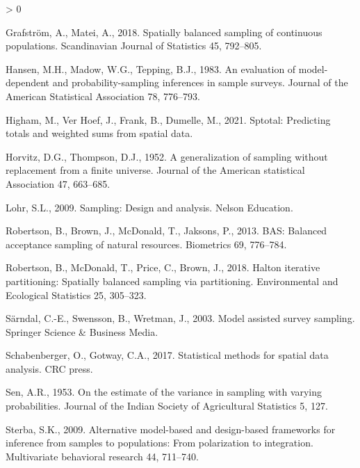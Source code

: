 \documentclass[]{elsarticle} %
\newlength{\cslhangindent}
\newenvironment{CSLReferences}[2] %
 {%
  \setlength{\parindent}{0pt}
  \ifodd #1 \everypar{\setlength{\hangindent}{\cslhangindent}}\ignorespaces\fi
  \ifnum #2 > 0
  \setlength{\parskip}{#2\baselineskip}
  \fi
 }%
 {}
\begin{document}
\begin{CSLReferences}{1}{0}
\leavevmode\hypertarget{ref-grafstrom2018spatially}{}%
Grafström, A., Matei, A., 2018. Spatially balanced sampling of
continuous populations. Scandinavian Journal of Statistics 45, 792--805.

\leavevmode\hypertarget{ref-hansen1983evaluation}{}%
Hansen, M.H., Madow, W.G., Tepping, B.J., 1983. An evaluation of
model-dependent and probability-sampling inferences in sample surveys.
Journal of the American Statistical Association 78, 776--793.

\leavevmode\hypertarget{ref-higham2021sptotal}{}%
Higham, M., Ver Hoef, J., Frank, B., Dumelle, M., 2021. Sptotal:
Predicting totals and weighted sums from spatial data.

\leavevmode\hypertarget{ref-horvitz1952generalization}{}%
Horvitz, D.G., Thompson, D.J., 1952. A generalization of sampling
without replacement from a finite universe. Journal of the American
statistical Association 47, 663--685.

\leavevmode\hypertarget{ref-lohr2009sampling}{}%
Lohr, S.L., 2009. Sampling: Design and analysis. Nelson Education.

\leavevmode\hypertarget{ref-robertson2013bas}{}%
Robertson, B., Brown, J., McDonald, T., Jaksons, P., 2013. BAS: Balanced
acceptance sampling of natural resources. Biometrics 69, 776--784.

\leavevmode\hypertarget{ref-robertson2018halton}{}%
Robertson, B., McDonald, T., Price, C., Brown, J., 2018. Halton
iterative partitioning: Spatially balanced sampling via partitioning.
Environmental and Ecological Statistics 25, 305--323.

\leavevmode\hypertarget{ref-sarndal2003model}{}%
Särndal, C.-E., Swensson, B., Wretman, J., 2003. Model assisted survey
sampling. Springer Science \& Business Media.

\leavevmode\hypertarget{ref-schabenberger2017statistical}{}%
Schabenberger, O., Gotway, C.A., 2017. Statistical methods for spatial
data analysis. CRC press.

\leavevmode\hypertarget{ref-sen1953estimate}{}%
Sen, A.R., 1953. On the estimate of the variance in sampling with
varying probabilities. Journal of the Indian Society of Agricultural
Statistics 5, 127.

\leavevmode\hypertarget{ref-sterba2009alternative}{}%
Sterba, S.K., 2009. Alternative model-based and design-based frameworks
for inference from samples to populations: From polarization to
integration. Multivariate behavioral research 44, 711--740.


\end{CSLReferences}
\end{document}
